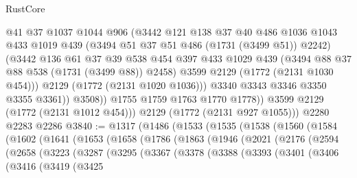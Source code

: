 \begin{lexlean}{RustCore}
\begin{coremodule}
                    @41
                    @37
                    @1037
                    @1044
                    @906
                    (@3442
                      @121
                      @138
                      @37
                      @40
                      @486
                      @1036
                      @1043
                      @433
                      @1019
                      @439
                      (@3494 @51 @37 @51 @486 (@1731 (@3499 @51)) @2242)
                      (@3442
                        @136
                        @61
                        @37
                        @39
                        @538
                        @454
                        @397
                        @433
                        @1029
                        @439
                        (@3494 @88 @37 @88 @538 (@1731 (@3499 @88)) @2458)
                        @3599
                        @2129
                        (@1772 (@2131 @1030 @454)))
                      @2129
                      (@1772 (@2131 @1020 @1036)))
                    @3340
                    @3343
                    @3346
                    @3350
                    @3355
                    @3361))
                @3508))
            @1755
            @1759
            @1763
            @1770
            @1778))
        @3599
        @2129
        (@1772 (@2131 @1012 @454)))
      @2129
      (@1772 (@2131 @927 @1055)))
    @2280
    @2283
    @2286
@3840 := @1317
    (@1486
      (@1533
        (@1535
          (@1538
            (@1560
              (@1584
                (@1602
                  (@1641
                    (@1653
                      (@1658
                        (@1786
                          (@1863
                            (@1946
                              (@2021
                                (@2176
                                  (@2594
                                    (@2658
                                      (@3223
                                        (@3287
                                          (@3295
                                            (@3367
                                              (@3378
                                                (@3388
                                                  (@3393
                                                    (@3401
                                                      (@3406
                                                        (@3416
                                                          (@3419
                                                            (@3425

\end{coremodule}
\end{lexlean}
